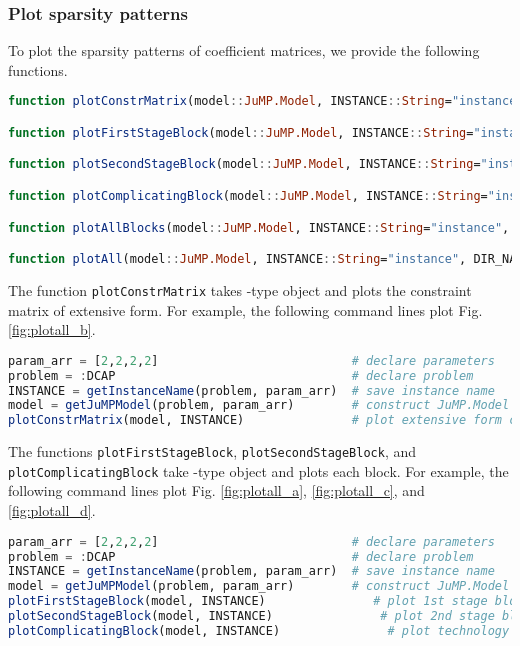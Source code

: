 \subsubsection{Plot sparsity patterns}
To plot the sparsity patterns of coefficient matrices, we provide the following functions.
\begin{lstlisting}[frame=single,language=julia]
function plotConstrMatrix(model::JuMP.Model, INSTANCE::String="instance", DIR_NAME::String="$(dirname(@__FILE__))/../plot")

function plotFirstStageBlock(model::JuMP.Model, INSTANCE::String="instance_block_A", DIR_NAME::String="$(dirname(@__FILE__))/../plot")

function plotSecondStageBlock(model::JuMP.Model, INSTANCE::String="instance_block_W", DIR_NAME::String="$(dirname(@__FILE__))/../plot")

function plotComplicatingBlock(model::JuMP.Model, INSTANCE::String="instance_block_T", DIR_NAME::String="$(dirname(@__FILE__))/../plot")

function plotAllBlocks(model::JuMP.Model, INSTANCE::String="instance", DIR_NAME::String="$(dirname(@__FILE__))/../plot")

function plotAll(model::JuMP.Model, INSTANCE::String="instance", DIR_NAME::String="$(dirname(@__FILE__))/../plot")
\end{lstlisting}
The function \texttt{plotConstrMatrix} takes \jumpmodel-type object and plots the constraint matrix of extensive form. For example, the following command lines plot Fig. \ref{fig:plotall_b}.
\begin{lstlisting}[frame=single,language=julia]
param_arr = [2,2,2,2]	                        # declare parameters
problem = :DCAP	                                # declare problem
INSTANCE = getInstanceName(problem, param_arr)	# save instance name
model = getJuMPModel(problem, param_arr)	    # construct JuMP.Model object
plotConstrMatrix(model, INSTANCE)               # plot extensive form constraint matrix   
\end{lstlisting}

The functions \texttt{plotFirstStageBlock}, \texttt{plotSecondStageBlock}, and \texttt{plotComplicatingBlock} take \jumpmodel-type object and plots each block. For example, the following command lines plot Fig. \ref{fig:plotall_a}, \ref{fig:plotall_c}, and \ref{fig:plotall_d}.
\begin{lstlisting}[frame=single,language=julia]
param_arr = [2,2,2,2]	                        # declare parameters
problem = :DCAP	                                # declare problem
INSTANCE = getInstanceName(problem, param_arr)	# save instance name
model = getJuMPModel(problem, param_arr)	    # construct JuMP.Model object
plotFirstStageBlock(model, INSTANCE)               # plot 1st stage block
plotSecondStageBlock(model, INSTANCE)               # plot 2nd stage block
plotComplicatingBlock(model, INSTANCE)               # plot technology block
\end{lstlisting}

